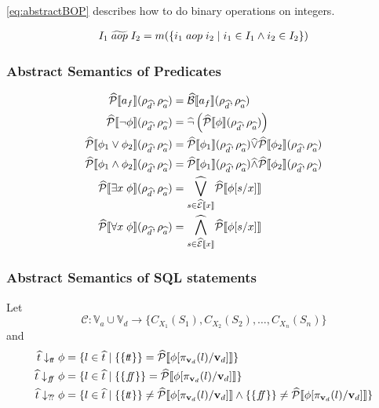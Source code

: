 \autoref{eq:abstractBOP} describes how to do binary operations on integers.

\begin{align}
    I_1 \;\aab{aop}\; I_2 &= m(\{i_1 \; aop \; i_2 \mid i_1 \in I_1 \land i_2 \in I_2\}) \\  \label{eq:abstractBOP}
\end{align}

\subsubsection{Abstract Semantics of Predicates}

\begin{align}
    \widehat{\mathcal{P}}\llbracket a_f \rrbracket(\rho_{\widehat{d}}, \rho_{\widehat{a}}) &= \widehat{\mathcal{B}}\llbracket a_f \rrbracket(\rho_{\widehat{d}}, \rho_{\widehat{a}}) \\
    \widehat{\mathcal{P}}\llbracket \neg \phi \rrbracket(\rho_{\widehat{d}}, \rho_{\widehat{a}}) &= \widehat{\neg} \left( \widehat{\mathcal{P}}\llbracket \phi \rrbracket(\rho_{\widehat{d}}, \rho_{\widehat{a}}) \right) \\
    \widehat{\mathcal{P}}\llbracket \phi_1 \lor \phi_2 \rrbracket(\rho_{\widehat{d}}, \rho_{\widehat{a}}) &= \widehat{\mathcal{P}}\llbracket \phi_1 \rrbracket(\rho_{\widehat{d}}, \rho_{\widehat{a}}) \widehat{\lor} \widehat{\mathcal{P}}\llbracket \phi_2 \rrbracket(\rho_{\widehat{d}}, \rho_{\widehat{a}}) \\
    \widehat{\mathcal{P}}\llbracket \phi_1 \land \phi_2 \rrbracket(\rho_{\widehat{d}}, \rho_{\widehat{a}}) &= \widehat{\mathcal{P}}\llbracket \phi_1 \rrbracket(\rho_{\widehat{d}}, \rho_{\widehat{a}}) \widehat{\land} \widehat{\mathcal{P}}\llbracket \phi_2 \rrbracket(\rho_{\widehat{d}}, \rho_{\widehat{a}}) \\
    \widehat{\mathcal{P}}\llbracket \exists x \; \phi \rrbracket(\rho_{\widehat{d}}, \rho_{\widehat{a}}) &= \underset{s \in \widehat{\mathcal{E}}\llbracket x \rrbracket}{\widehat{\bigvee}} \widehat{\mathcal{P}}\llbracket \phi[s/x] \rrbracket \\
    \widehat{\mathcal{P}}\llbracket \forall x \; \phi \rrbracket(\rho_{\widehat{d}}, \rho_{\widehat{a}}) &= \underset{s \in \widehat{\mathcal{E}}\llbracket x \rrbracket}{\widehat{\bigwedge}} \widehat{\mathcal{P}}\llbracket \phi[s/x] \rrbracket
\end{align}

\subsubsection{Abstract Semantics of SQL statements}

Let
\begin{equation}
    \mathcal{C} : \mathbb{V}_a \cup \mathbb{V}_d \rightarrow \{ C_{X_1}(S_1), C_{X_2}(S_2), \dots, C_{X_n}(S_n) \}
\end{equation}
and
\begin{align}
    \abstable \downarrow_{\true} \phi &= \{ l \in \ab{t} \mid \{\{ \true \}\} = \abspredsem{\phi[\pi_{\mathbf{v}_d}(l)/\mathbf{v}_d]} \} \\
    \abstable \downarrow_{\false} \phi &= \{ l \in \ab{t} \mid \{\{ \false \}\} = \abspredsem{\phi[\pi_{\mathbf{v}_d}(l)/\mathbf{v}_d]} \} \\
    \abstable \downarrow_{\unknown} \phi &= \{ l \in \ab{t} \mid \{\{ \true \}\} \neq \abspredsem{\phi[\pi_{\mathbf{v}_d}(l)/\mathbf{v}_d]} \land \{\{ \false \}\} \neq \abspredsem{\phi[\pi_{\mathbf{v}_d}(l)/\mathbf{v}_d]}\} \\
\end{align}

